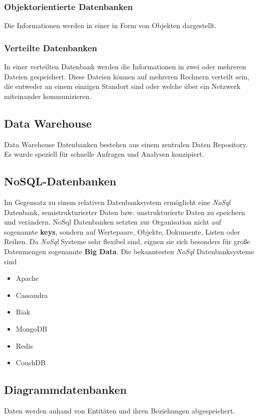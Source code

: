 \subsubsection{Objektorientierte Datenbanken}
Die Informationen werden in einer in Form von Objekten dargestellt.

\subsubsection{Verteilte Datenbanken}
In einer verteilten Datenbank werden die Informationen in zwei oder mehreren Dateien gespeichert.
Diese Dateien können auf mehreren Rechnern verteilt sein, die entweder an einem einzigen Standort
sind oder welche über ein Netzwerk miteinander kommunizieren.

\subsection{Data Warehouse}
Data Warehouse Datenbanken bestehen aus einem zentralen Daten Repository. Es wurde speziell für
schnelle Anfragen und Analysen konzipiert.

\subsection{NoSQL-Datenbanken}
Im Gegensatz zu einem relativen Datenbanksystem ermöglicht eine \textit{NoSql} Datenbank,
semistrukturierter Daten bzw. unstrukturierte Daten zu speichern und verändern. NoSql Datenbanken
setzten zur Organisation nicht auf sogenannte \textbf{keys}, sondern auf Wertepaare, Objekte, Dokumente,
Listen oder Reihen. Da \textit{NoSql} Systeme sehr flexibel sind, eignen sie sich
besonders für große Datenmengen sogenannte \textbf{Big Data}. Die bekanntesten
\textit{NoSql} Datenbanksysteme sind
\begin{itemize}
    \item Apache
    \item Cassandra
    \item Riak
    \item MongoDB
    \item Redis
    \item CouchDB
\end{itemize}

\subsection{Diagrammdatenbanken}
Daten werden anhand von Entitäten und ihren Beziehungen abgespeichert.

